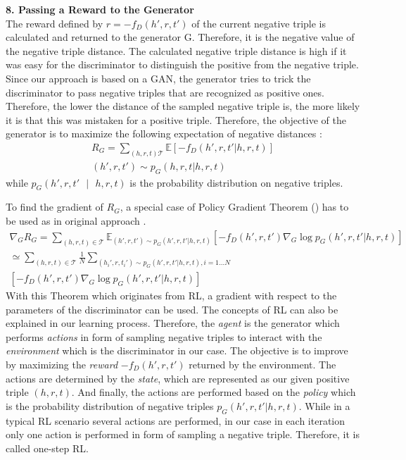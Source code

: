 \textbf{8. Passing a Reward to the Generator}\\
%
The reward defined by $r = - f_D(h',r,t')$ of the current negative triple is calculated and returned to the generator G.
Therefore, it is the negative value of the negative triple distance.
The calculated negative triple distance is high if it was easy for the discriminator to distinguish the positive from the negative triple.
Since our approach is based on a \ac{GAN}, the generator tries to trick the discriminator to pass negative triples that are recognized as positive ones.
Therefore, the lower the distance of the sampled negative triple is, the more likely it is that this was mistaken for a positive triple.
Therefore, the objective of the generator is to maximize the following expectation of negative distances \cite{cai2017kbgan}:
\begin{multline}
    R_G = \sum_{(h,r,t) \mathcal{T}}{\mathbb{E}[-f_D(h',r,t'|h,r,t)]}\\
    (h',r,t') \sim p_G(h,r,t|h,r,t) 
\end{multline}
while $p_G(h', r, t'\text{ }|\text{ }h, r, t)$ is the probability distribution on negative triples.
\clearpage 

To find the gradient of $R_G$, a special case of Policy Gradient Theorem (\cite{NIPS1999_464d828b}) has to be used as in original approach \cite{cai2017kbgan}.
\begin{multline}
    \nabla_G R_G=\sum_{(h,r,t)\in\mathcal{T}}\mathbb{E}_{(h',r,t')\sim p_G(h',r,t'|h,r,t)}
    [-f_D(h',r,t')\nabla_G \log p_G(h',r,t'|h,r,t)] \\
    \simeq \sum_{(h,r,t)\in\mathcal{T}}\frac{1}{N}\sum_{(h_i',r,t_i')\sim p_G(h',r,t'|h,r,t), i=1\dots N} \\
    [-f_D(h',r,t')\nabla_G \log p_G(h',r,t'|h,r,t)]
\end{multline}
With this Theorem which originates from \ac{RL}, a gradient with respect to the parameters of the discriminator can be used.
The concepts of \ac{RL} can also be explained in our learning process.
Therefore, the \textit{agent} is the generator which performs \textit{actions} in form of sampling negative triples to interact with the \textit{environment} which is the discriminator in our case.
The objective is to improve by maximizing the \textit{reward} $-f_D(h',r,t')$ returned by the environment.
The actions are determined by the \textit{state}, which are represented as our given positive triple $(h,r,t)$.
And finally, the actions are performed based on the \textit{policy} which is the probability distribution of negative triples $p_G(h',r,t'|h,r,t)$.
While in a typical \ac{RL} scenario several actions are performed, in our case in each iteration only one action is performed in form of sampling a negative triple.
Therefore, it is called one-step \ac{RL}.